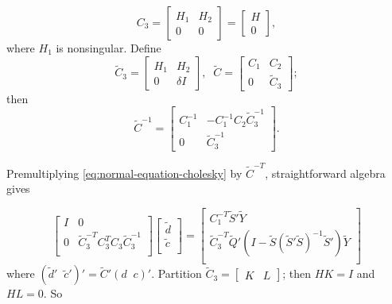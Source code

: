 \documentclass[12pt]{article}
\newcommand{\tildeY}{\tilde{Y}}
\newcommand{\tildeQ}{\tilde{Q}}
\newcommand{\tildeS}{\tilde{S}}
\theoremstyle{definition}
\begin{document}
\begin{equation*}
C_3 = \begin{bmatrix} H_1 & H_2 \\ 0 & 0 \end{bmatrix} = \begin{bmatrix} H \\  0 \end{bmatrix},
\end{equation*}
\noindent
where $H_1$ is nonsingular. Define
\begin{equation} \label{eq:cholesky-factor-mod}
\tilde{C}_3 = \begin{bmatrix}
H_1 & H_2 \\
0  & \delta I 
\end{bmatrix}, \;\;
\tilde{C} = \begin{bmatrix}
C_1 & C_2 \\
0  & \tilde{C}_3 
\end{bmatrix};
\end{equation}
\noindent
then
\begin{equation} \label{eq:cholesky-factor-mod-inverse}
\tilde{C}^{-1} = \begin{bmatrix}
C_1^{-1} & -C_1^{-1} C_2 \tilde{C}_3^{-1} \\
0  & \tilde{C}_3^{-1}
\end{bmatrix}.
\end{equation}

Premultiplying \ref{eq:normal-equation-cholesky} by $\tilde{C}^{-T}$, straightforward algebra gives 

\begin{equation} \label{eq:vectorized-normal-equations-cholesky}
\begin{bmatrix}
I & 0 \\
0 & \tilde{C}_3^{-T} C_3^{T} C_3 \tilde{C}_3^{-1}\\
\end{bmatrix}
\begin{bmatrix}
\tilde{d}\\
\tilde{c}\\
\end{bmatrix}
= \begin{bmatrix}
C_1^{-T} \tildeS'\tildeY \\
\tilde{C}_3^{-T} \tildeQ'\left( I - \tildeS\left( \tildeS' \tildeS \right)^{-1} \tildeS' \right) \tildeY\\
\end{bmatrix}
\end{equation}
\noindent
where $\left( \tilde{d}'\;\;\tilde{c}' \right)' =  \tilde{C}' \left( d\;\;c \right)'$. Partition $\tilde{C}_3 = \begin{bmatrix} K &  L\end{bmatrix}$; then $HK = I$ and $HL = 0$. So
\end{document}
